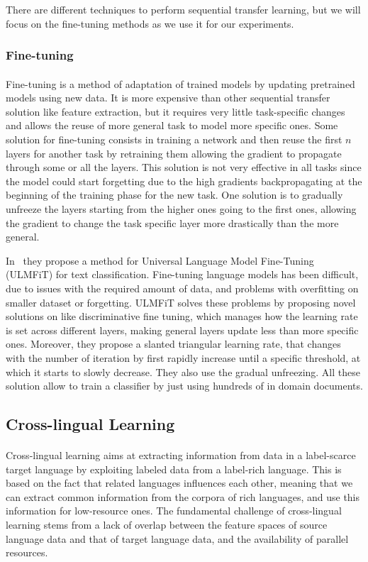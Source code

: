 There are different techniques to perform sequential transfer learning, but we will focus on the fine-tuning methods as we use it for our experiments. 

\subsubsection{Fine-tuning}
\paragraph{}
Fine-tuning is a method of adaptation of trained models by updating pretrained models using new data. It is more expensive than other sequential transfer solution like feature extraction, but it requires very little task-specific changes and allows the reuse of more general task to model more specific ones.
Some solution for fine-tuning consists in training a network and then reuse the first $n$ layers for another task by retraining them allowing the gradient to propagate through some or all the layers. This solution is not very effective in all tasks since the model could start forgetting due to the high gradients backpropagating at the beginning of the training phase for the new task. One solution is to gradually unfreeze the layers starting from the higher ones going to the first ones, allowing the gradient to change the task specific layer more drastically than the more general. 

In~\citep{howard-ruder-2018-universal} they propose a method for Universal Language Model Fine-Tuning (ULMFiT) for text classification. Fine-tuning language models has been difficult, due to issues with the required amount of data, and problems with overfitting on smaller dataset or forgetting. ULMFiT solves these problems by proposing novel solutions on like discriminative fine tuning, which manages how the learning rate is set across different layers, making general layers update less than more specific ones. Moreover, they propose a slanted triangular learning rate, that changes with the number of iteration by first rapidly increase until a specific threshold, at which it starts to slowly decrease. They also use the gradual unfreezing. All these solution allow to train a classifier by just using hundreds of in domain documents.

\subsection{Cross-lingual Learning}
\paragraph{}
Cross-lingual learning aims at extracting information from data in a label-scarce target language by exploiting labeled data from a label-rich language. This is based on the fact that related languages influences each other, meaning that we can extract common information from the corpora of rich languages, and use this information for low-resource ones.  The fundamental challenge of cross-lingual learning stems from a lack of overlap between the feature spaces of source language data and that of target language data, and the availability of parallel resources. 

